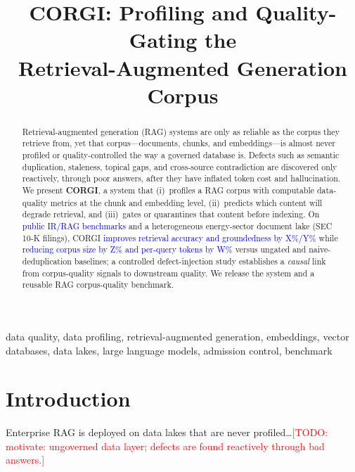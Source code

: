 \documentclass[conference]{IEEEtran}
\newcommand{\todo}[1]{\textcolor{red}{[TODO: #1]}}
\newcommand{\num}[1]{\textcolor{blue}{#1}} %
\begin{document}
\title{CORGI: Profiling and Quality-Gating the\\ Retrieval-Augmented Generation Corpus}

\author{
}

\maketitle

\begin{abstract}
Retrieval-augmented generation (RAG) systems are only as reliable as the corpus they
retrieve from, yet that corpus---documents, chunks, and embeddings---is almost never
profiled or quality-controlled the way a governed database is. Defects such as semantic
duplication, staleness, topical gaps, and cross-source contradiction are discovered only
reactively, through poor answers, after they have inflated token cost and hallucination.
We present \textbf{CORGI}, a system that (i)~profiles a RAG corpus with computable
data-quality metrics at the chunk and embedding level, (ii)~predicts which content will
degrade retrieval, and (iii)~gates or quarantines that content before indexing. On
\num{public IR/RAG benchmarks} and a heterogeneous energy-sector document lake
(SEC 10-K filings), CORGI \num{improves retrieval accuracy and groundedness by X\%/Y\%}
while \num{reducing corpus size by Z\% and per-query tokens by W\%} versus ungated and
naive-deduplication baselines; a controlled defect-injection study establishes a
\emph{causal} link from corpus-quality signals to downstream quality. We release the system
and a reusable RAG corpus-quality benchmark.
\end{abstract}

\begin{IEEEkeywords}
data quality, data profiling, retrieval-augmented generation, embeddings, vector databases,
data lakes, large language models, admission control, benchmark
\end{IEEEkeywords}

\section{Introduction}\label{sec:intro}
Enterprise RAG is deployed on data lakes that are never profiled\ldots \todo{motivate:
ungoverned data layer; defects are found reactively through bad answers.}
\end{document}

